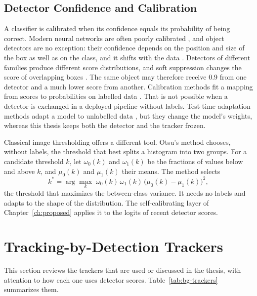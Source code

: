 \subsection{Detector Confidence and Calibration}\label{sec:bg-confidence}
A classifier is calibrated when its confidence equals its probability of being correct. Modern neural networks are often poorly calibrated \cite{guo2017calibration}, and object detectors are no exception: their confidence depends on the position and size of the box as well as on the class, and it shifts with the data \cite{kuppers2020detcalib}. Detectors of different families \cite{redmon2016yolo,ren2017fasterrcnn,carion2020detr,zhao2024rtdetr,wang2024yolov9} produce different score distributions, and soft suppression changes the score of overlapping boxes \cite{bodla2017softnms}. The same object may therefore receive 0.9 from one detector and a much lower score from another. Calibration methods fit a mapping from scores to probabilities on labelled data \cite{kuppers2020detcalib}. That is not possible when a detector is exchanged in a deployed pipeline without labels. Test-time adaptation methods adapt a model to unlabelled data \cite{wang2021tent}, but they change the model's weights, whereas this thesis keeps both the detector and the tracker frozen.

Classical image thresholding offers a different tool. Otsu's method \cite{goh2018otsu} chooses, without labels, the threshold that best splits a histogram into two groups. For a candidate threshold $k$, let $\omega_0(k)$ and $\omega_1(k)$ be the fractions of values below and above $k$, and $\mu_0(k)$ and $\mu_1(k)$ their means. The method selects
\begin{equation}
k^{*}=\arg\max_{k}\;\omega_0(k)\,\omega_1(k)\,\bigl(\mu_0(k)-\mu_1(k)\bigr)^2,
\label{eq:bg-otsu}
\end{equation}
the threshold that maximizes the between-class variance. It needs no labels and adapts to the shape of the distribution. The self-calibrating layer of Chapter~\ref{ch:proposed} applies it to the logits of recent detector scores.

\section{Tracking-by-Detection Trackers}\label{sec:bg-trackers}
This section reviews the trackers that are used or discussed in the thesis, with attention to how each one uses detector scores. Table~\ref{tab:bg-trackers} summarizes them.

